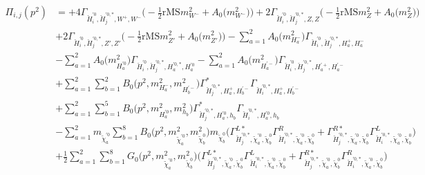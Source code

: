 \begin{itemize}
\begin{align} 
\Pi_{i,j}(p^2) &= +4 {\Gamma_{\check{H}^{'0}_{{i}},\check{H}^{{'0},*}_{{j}},W^+,W^-}} \Big(-\frac{1}{2} \text{rMS} m^2_{W^-}  + {A_0\Big(m^2_{W^-}\Big)}\Big)+2 {\Gamma_{\check{H}^{'0}_{{i}},\check{H}^{{'0},*}_{{j}},Z,Z}} \Big(-\frac{1}{2} \text{rMS} m^2_{Z}  + {A_0\Big(m^2_{Z}\Big)}\Big)\nonumber \\ 
 &+2 {\Gamma_{\check{H}^{'0}_{{i}},\check{H}^{{'0},*}_{{j}},{Z'},{Z'}}} \Big(-\frac{1}{2} \text{rMS} m^2_{{Z'}}  + {A_0\Big(m^2_{{Z'}}\Big)}\Big)- \sum_{a=1}^{2}{A_0\Big(m^2_{H^-_{{a}}}\Big)} {\Gamma_{\check{H}^{'0}_{{i}},\check{H}^{{'0},*}_{{j}},H^+_{{a}},H^-_{{a}}}}  \nonumber \\ 
 &- \sum_{a=1}^{2}{A_0\Big(m^2_{H^{'0}_{{a}}}\Big)} {\Gamma_{\check{H}^{'0}_{{i}},\check{H}^{{'0},*}_{{j}},H^{{'0},*}_{{a}},H^{'0}_{{a}}}}  - \sum_{a=1}^{2}{A_0\Big(m^2_{H^{'-}_{{a}}}\Big)} {\Gamma_{\check{H}^{'0}_{{i}},\check{H}^{{'0},*}_{{j}},H^{'+}_{{a}},H^{'-}_{{a}}}}  \nonumber \\ 
 &+\sum_{a=1}^{2}\sum_{b=1}^{2}{B_0\Big(p^{2},m^2_{H^-_{{a}}},m^2_{H^{'-}_{{b}}}\Big)} {\Gamma^*_{\check{H}^{{'0},*}_{{j}},H^+_{{a}},H^{'-}_{{b}}}} {\Gamma_{\check{H}^{{'0},*}_{{i}},H^+_{{a}},H^{'-}_{{b}}}} \nonumber \\ 
 &+\sum_{a=1}^{2}\sum_{b=1}^{5}{B_0\Big(p^{2},m^2_{H^{'0}_{{a}}},m^2_{h_{{b}}}\Big)} {\Gamma^*_{\check{H}^{{'0},*}_{{j}},H^{'0}_{{a}},h_{{b}}}} {\Gamma_{\check{H}^{{'0},*}_{{i}},H^{'0}_{{a}},h_{{b}}}} \nonumber \\ 
 &- \sum_{a=1}^{2}m_{\tilde{\chi}^{'0}_{{a}}} \sum_{b=1}^{8}{B_0\Big(p^{2},m^2_{\tilde{\chi}^{'0}_{{a}}},m^2_{\tilde{\chi}^0_{{b}}}\Big)} m_{\tilde{\chi}^0_{{b}}} \Big({\Gamma^{L*}_{\check{H}^{{'0},*}_{{j}},\tilde{\chi}^{'0}_{{a}},\tilde{\chi}^0_{{b}}}} {\Gamma^R_{\check{H}^{{'0},*}_{{i}},\tilde{\chi}^{'0}_{{a}},\tilde{\chi}^0_{{b}}}}  + {\Gamma^{R*}_{\check{H}^{{'0},*}_{{j}},\tilde{\chi}^{'0}_{{a}},\tilde{\chi}^0_{{b}}}} {\Gamma^L_{\check{H}^{{'0},*}_{{i}},\tilde{\chi}^{'0}_{{a}},\tilde{\chi}^0_{{b}}}} \Big)  \nonumber \\ 
 &+\frac{1}{2} \sum_{a=1}^{2}\sum_{b=1}^{8}{G_0\Big(p^{2},m^2_{\tilde{\chi}^{'0}_{{a}}},m^2_{\tilde{\chi}^0_{{b}}}\Big)} \Big({\Gamma^{L*}_{\check{H}^{{'0},*}_{{j}},\tilde{\chi}^{'0}_{{a}},\tilde{\chi}^0_{{b}}}} {\Gamma^L_{\check{H}^{{'0},*}_{{i}},\tilde{\chi}^{'0}_{{a}},\tilde{\chi}^0_{{b}}}}  + {\Gamma^{R*}_{\check{H}^{{'0},*}_{{j}},\tilde{\chi}^{'0}_{{a}},\tilde{\chi}^0_{{b}}}} {\Gamma^R_{\check{H}^{{'0},*}_{{i}},\tilde{\chi}^{'0}_{{a}},\tilde{\chi}^0_{{b}}}} \Big) \nonumber \\ 

\end{align}
\end{itemize}
